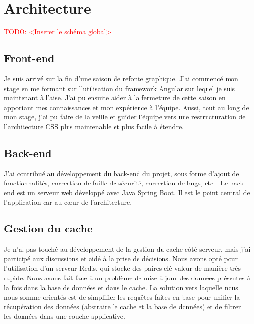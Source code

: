 \documentclass[12pt, a4paper]{report}
\makeatletter
\newcommand\tab[1][1cm]{\hspace*{#1}}
\newcommand\TODO[1]{\textcolor{red}{TODO\@: #1}}
\makeatother
\begin{document}
        \section{Architecture}
            \TODO{<Inserer le schéma global>}
            \subsection{Front-end}
                \tab{} Je suis arrivé sur la fin d'une saison de refonte graphique.
                J'ai commencé mon stage en me formant sur l'utilisation du framework Angular sur lequel je suis maintenant à l'aise.
                J'ai pu ensuite aider à la fermeture de cette saison en apportant mes connaissances et mon expérience à l'équipe.\newline
                Aussi, tout au long de mon stage, j'ai pu faire de la veille et guider l'équipe vers une restructuration de l'architecture CSS plus maintenable et plus facile à étendre.
            \subsection{Back-end}
                J'ai contribué au développement du back-end du projet, sous forme d'ajout de fonctionnalités, correction de faille de sécurité, correction de bugs, etc\ldots\newline
                Le back-end est un serveur web développé avec Java Spring Boot. Il est le point central de l'application car au cœur de l'architecture.
            \subsection{Gestion du cache}
                Je n'ai pas touché au développement de la gestion du cache côté serveur, mais j'ai participé aux discussions et aidé à la prise de décisions.
                Nous avons opté pour l'utilisation d'un serveur Redis, qui stocke des paires clé-valeur de manière très rapide.\newline
                Nous avons fait face à un problème de mise à jour des données présentes à la fois dans la base de données et dans le cache. La solution vers laquelle nous nous somme orientés est de simplifier les requêtes faites en base pour unifier la récupération des données (abstraire le cache et la base de données) et de filtrer les données dans une couche applicative.
\end{document}
